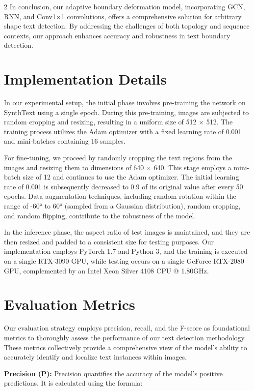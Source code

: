 \documentclass[sn-mathphys,Numbered]{sn-jnl}%
\begin{document}
\begin{multicols}{2}
In conclusion, our adaptive boundary deformation model, incorporating GCN, RNN, and Conv1×1 convolutions, offers a comprehensive solution for arbitrary shape text detection. By addressing the challenges of both topology and sequence contexts, our approach enhances accuracy and robustness in text boundary detection.

\section{Implementation Details}
In our experimental setup, the initial phase involves pre-training the network on SynthText using a single epoch. During this pre-training, images are subjected to random cropping and resizing, resulting in a uniform size of 512 × 512. The training process utilizes the Adam optimizer with a fixed learning rate of 0.001 and mini-batches containing 16 samples.

For fine-tuning, we proceed by randomly cropping the text regions from the images and resizing them to dimensions of 640 × 640. This stage employs a mini-batch size of 12 and continues to use the Adam optimizer. The initial learning rate of 0.001 is subsequently decreased to 0.9 of its original value after every 50 epochs. Data augmentation techniques, including random rotation within the range of -60° to 60° (sampled from a Gaussian distribution), random cropping, and random flipping, contribute to the robustness of the model.

In the inference phase, the aspect ratio of test images is maintained, and they are then resized and padded to a consistent size for testing purposes. Our implementation employs PyTorch 1.7 and Python 3, and the training is executed on a single RTX-3090 GPU, while testing occurs on a single GeForce RTX-2080 GPU, complemented by an Intel Xeon Silver 4108 CPU @ 1.80GHz.

\section{Evaluation Metrics}
Our evaluation strategy employs precision, recall, and the F-score as foundational metrics to thoroughly assess the performance of our text detection methodology. These metrics collectively provide a comprehensive view of the model's ability to accurately identify and localize text instances within images.

\textbf{Precision (P):} Precision quantifies the accuracy of the model's positive predictions. It is calculated using the formula:


\end{multicols}
\end{document}
